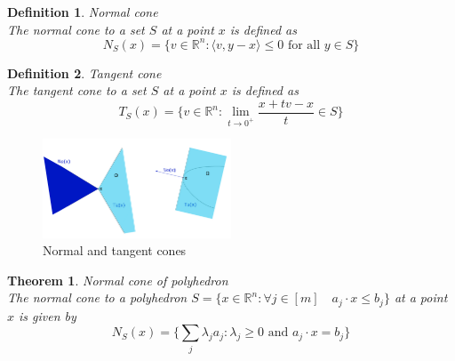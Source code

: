 \documentclass[11pt]{book} %
\newtheorem{theorem}{Theorem}[section]
\newtheorem{definition}{Definition}[section]
\begin{document}
\begin{definition}{Normal cone} \\
The normal cone to a set $S$ at a point $x$ is defined as
\begin{equation}
    N_S(x) = \{ v \in \mathbb{R}^n : \langle v, y-x \rangle \leq 0 \text{ for all } y \in S \}
\end{equation}
\end{definition}

\begin{definition}{Tangent cone} \\
The tangent cone to a set $S$ at a point $x$ is defined as
\begin{equation}
    T_S(x) = \{ v \in \mathbb{R}^n : \lim_{t \rightarrow 0^+} \frac{x + tv - x}{t} \in S \}
\end{equation}
\end{definition}

\begin{figure}[H]
    \centering
    \includegraphics[width=0.5\textwidth]{Figs/normal-cones.png}
    \caption{Normal and tangent cones}
\end{figure}

\begin{theorem}{Normal cone of polyhedron} \\
The normal cone to a polyhedron $S = \{x \in \mathbb{R}^n : \forall j \in [m] \quad a_j \cdot x \leq b_j\}$ at a point $x$ is given by
\begin{equation}
    N_S(x) = \{ \sum_{j} \lambda_j a_j : \lambda_j \geq 0  \text{ and }  a_j \cdot x = b_j \}
\end{equation}
    
\end{theorem}

\end{document}
